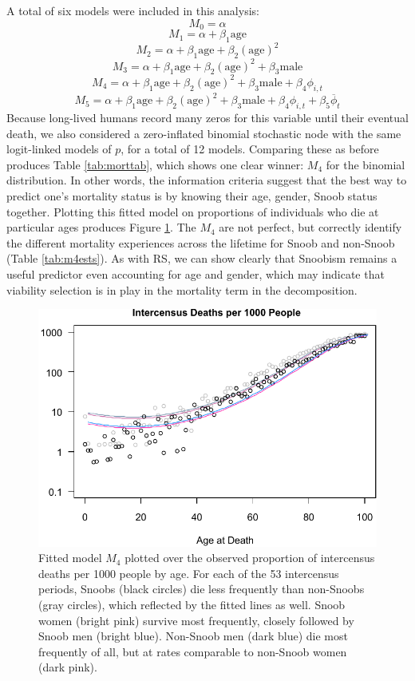 A total of six models were included in this analysis:
	\[M_0 = \alpha
\]
	\[M_1 = \alpha + \beta_1 \mathrm{age}
\]
	\[M_2 = \alpha + \beta_1 \mathrm{age} + \beta_2 \mathrm{(age)}^2
\]
	\[M_3 = \alpha + \beta_1 \mathrm{age} + \beta_2 \mathrm{(age)}^2 + \beta_3 \mathrm{male}
\]
	\[M_4 = \alpha + \beta_1 \mathrm{age} + \beta_2 \mathrm{(age)}^2 + \beta_3 \mathrm{male} + \beta_4 \phi_{i,t}
\]
	\[M_5 = \alpha + \beta_1 \mathrm{age} + \beta_2 \mathrm{(age)}^2 + \beta_3 \mathrm{male} + \beta_4 \phi_{i,t} + \beta_5 \overline{\phi}_t
\]
Because long-lived humans record many zeros for this variable until their eventual death, we also considered a zero-inflated binomial stochastic node with the same logit-linked models of $p$, for a total of 12 models.  Comparing these as before produces Table \ref{tab:morttab}, which shows one clear winner: $M_4$ for the binomial distribution.  In other words, the information criteria suggest that the best way to predict one's mortality status is by knowing their age, gender, Snoob status together.  Plotting this fitted model on proportions of individuals who die at particular ages produces Figure \ref{fig:mortality}.  The $M_4$ are not perfect, but correctly identify the different mortality experiences across the lifetime for Snoob and non-Snoob (Table \ref{tab:m4ests}).  As with RS, we can show clearly that Snoobism remains a useful predictor even accounting for age and gender, which may indicate that viability selection is in play in the mortality term in the decomposition.  



\begin{figure}[t]
\begin{center}
\includegraphics[scale=1]{figures/rtdice/mortality.pdf}
\caption{Fitted model $M_{4}$ plotted over the observed proportion of intercensus deaths per 1000 people by age.  For each of the 53 intercensus periods, Snoobs (black circles) die less frequently than non-Snoobs (gray circles), which reflected by the fitted lines as well.  Snoob women (bright pink) survive most frequently, closely followed by Snoob men (bright blue).  Non-Snoob men (dark blue) die most frequently of all, but at rates comparable to non-Snoob women (dark pink).}
\label{fig:mortality}
\end{center}
\end{figure}



